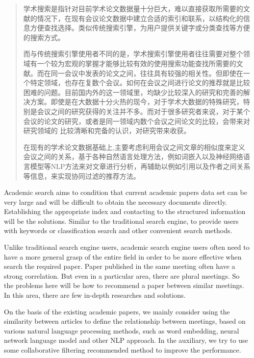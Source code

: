 
\begin{abstract}

学术搜索是指针对目前学术论文数据量十分巨大，难以直接获取所需要的文献的情况下，在现有会议论文数据中建立合适的索引和联系，以结构化的信息方便查找选择。类似传统搜索引擎，为用户提供关键字或分类查找等方便的搜索方式。

而与传统搜索引擎使用者不同的是，学术搜索引擎使用者往往需要对整个领域有一个较为宏观的掌握才能够比较有效的使用搜索功能查找所需要的文献。而在同一会议中发表的论文之间，往往具有较强的相关性。但即使在一个特定领域，也存在复数个会议。如何在会议之间进行论文的推荐就是比较困难的问题。目前国内外的这一领域里，均缺少比较深入的研究和完善的解决方案。即使是在大数据十分火热的现今，对于学术大数据的特殊研究，特别是会议之间的研究获得的关注并不多。而对于很多研究者来说，对于某个会议的论文的研究，或者是同一领域内数个会议之间论文的比较，会带来对研究领域的 比较清晰和完备的认识，对研究带来收获。

在现有的学术论文数据基础上,主要考虑利用会议之间文章的相似度来定义会议之间的关系，基于各种自然语言处理方法，例如词嵌入以及神经网络语言模型等NLP方法来对文章进行分析，再辅助以例如引用以及作者之间关系等信息，来实现协同过滤的推荐方法。

\end{abstract}

\begin{englishabstract}

Academic search aims to condition that current academic papers data set can be very large and will be difficult to obtain the necessary documents directly. Establishing the appropriate index and contacting to the structured information will be the solutions. Similar to the traditional search engine, to provide users with keywords or classification search and other convenient search methods.

Unlike traditional search engine users, academic search engine users often need to have a more general grasp of the entire field in order to be more effective when search the required paper. Paper published in the same meeting often have a strong correlation. But even in a particular area, there are plural meetings. So the problems here will be how to recommend a paper between similar meetings. In this area, there are few in-depth researches and solutions. 

On the basis of the existing academic papers, we mainly consider using the similarity between articles to define the relationship between meetings, based on various natural language processing methods, such as word embedding, neural network language model and other NLP approach. In the auxiliary, we try to use some collaborative filtering recommended method to improve the performance.

\end{englishabstract}
